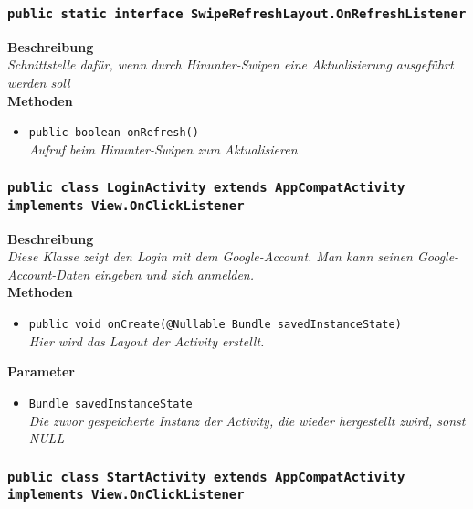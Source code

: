 \subsubsection{\texttt{public static interface SwipeRefreshLayout.OnRefreshListener}}

	\textbf{Beschreibung} \\
	\textit{Schnittstelle dafür, wenn durch Hinunter-Swipen eine Aktualisierung ausgeführt werden soll} \\

	\textbf{Methoden}
	\begin{itemize}
		\item\texttt{{public boolean onRefresh()}}\\
	\textit{Aufruf beim Hinunter-Swipen zum Aktualisieren}\\
	\end{itemize}       

\subsubsection{\texttt{public class LoginActivity extends AppCompatActivity implements View.OnClickListener}}

	\textbf{Beschreibung} \\
	\textit{Diese Klasse zeigt den Login mit dem Google-Account. Man kann seinen Google-Account-Daten eingeben und sich anmelden.} \\

	\textbf{Methoden}
	\begin{itemize}
		\item\texttt{{public void onCreate(@Nullable Bundle savedInstanceState)}}\\
	\textit{Hier wird das Layout der Activity erstellt.}\\
	\end{itemize}

	\textbf{Parameter}
	\begin{itemize}
		\item\texttt{Bundle savedInstanceState}\\ 
	\textit{Die zuvor gespeicherte Instanz der Activity, die wieder hergestellt zwird, sonst NULL}\\
	\end{itemize}

\subsubsection{\texttt{public class StartActivity extends AppCompatActivity implements View.OnClickListener}}

